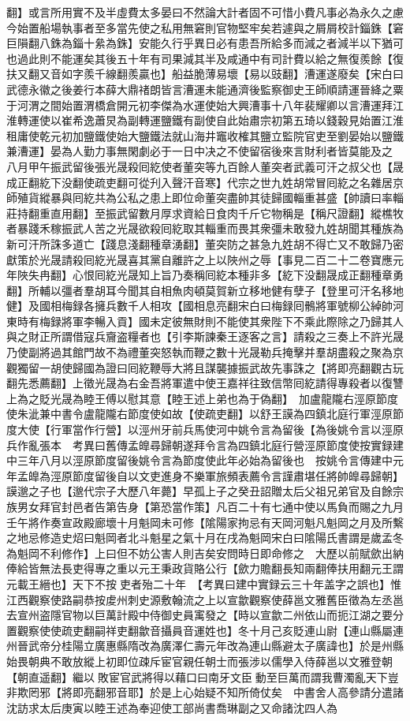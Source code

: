 翻】或言所用實不及半虛費太多晏曰不然論大計者固不可惜小費凡事必為永久之慮今始置船場執事者至多當先使之私用無窘則官物堅牢矣若遽與之屑屑校計錙銖【窘巨隕翻八銖為錙十絫為銖】安能久行乎異日必有患吾所給多而減之者減半以下猶可也過此則不能運矣其後五十年有司果減其半及咸通中有司計費以給之無復羨餘【復扶又翻又音如字羨千線翻羨贏也】船益脆薄易壞【易以豉翻】漕運遂廢矣【宋白曰武德永徽之後姜行本薛大鼎禇朗皆言漕運未能通濟後監察御史王師順請運晉絳之粟于河渭之間始置渭橋倉開元初李傑為水運使始大興漕事十八年裴耀卿以言漕運拜江淮轉運使以崔希逸蕭炅為副轉運鹽鐵有副使自此始肅宗初第五琦以錢穀見始置江淮租庸使乾元初加鹽鐵使始大鹽鐵法就山海井竈收榷其鹽立監院官吏至劉晏始以鹽鐵兼漕運】晏為人勤力事無閑劇必于一日中决之不使留宿後來言財利者皆莫能及之　八月甲午振武留後張光晟殺囘紇使者董突等九百餘人董突者武義可汗之叔父也【晟成正翻紇下没翻使疏吏翻可從刋入聲汗音寒】代宗之世九姓胡常冒囘紇之名雜居京師殖貨縱暴與囘紇共為公私之患上即位命董突盡帥其徒歸國輜重甚盛【帥讀曰率輜莊持翻重直用翻】至振武留數月厚求資給日食肉千斤它物稱是【稱尺證翻】縱樵牧者暴踐禾稼振武人苦之光晟欲殺囘紇取其輜重而畏其衆彊未敢發九姓胡聞其種族為新可汗所誅多道亡【踐息淺翻種章湧翻】董突防之甚急九姓胡不得亡又不敢歸乃密獻策於光晟請殺囘紇光晟喜其黨自離許之上以陜州之辱【事見二百二十二卷寶應元年陜失冉翻】心恨囘紇光晟知上旨乃奏稱囘紇本種非多【紇下没翻晟成正翻種章勇翻】所輔以彊者羣胡耳今聞其自相魚肉頓莫賀新立移地健有孽子【登里可汗名移地健】及國相梅録各擁兵數千人相攻【國相息亮翻宋白曰梅録囘鶻將軍號柳公綽帥河東時有梅録將軍李暢入貢】國未定彼無財則不能使其衆陛下不乘此際除之乃歸其人與之財正所謂借寇兵齎盗糧者也【引李斯諫秦王逐客之言】請殺之三奏上不許光晟乃使副將過其館門故不為禮董突怒執而鞭之數十光晟勒兵掩擊并羣胡盡殺之聚為京觀獨留一胡使歸國為證曰囘紇鞭辱大將且謀襲據振武故先事誅之【將即亮翻觀古玩翻先悉薦翻】上徵光晟為右金吾將軍遣中使王嘉祥往致信幣囘紇請得專殺者以復讐上為之貶光晟為睦王傅以慰其意【睦王述上弟也為于偽翻】　加盧龍隴右涇原節度使朱泚兼中書令盧龍隴右節度使如故【使疏吏翻】以舒王謨為四鎮北庭行軍涇原節度大使【行軍當作行營】以涇州牙前兵馬使河中姚令言為留後【為後姚令言以涇原兵作亂張本　考異曰舊傳孟皥尋歸朝遂拜令言為四鎮北庭行營涇原節度使按實録建中三年八月以涇原節度留後姚令言為節度使此年必始為留後也　按姚令言傳建中元年孟皥為涇原節度留後自以文吏進身不樂軍旅頻表薦令言謹肅堪任將帥皥尋歸朝】謨邈之子也【邈代宗子大歷八年薨】早孤上子之癸丑詔贈太后父祖兄弟官及自餘宗族男女拜官封邑者告第告身【第恐當作策】凡百二十有七通中使以馬負而賜之九月壬午將作奏宣政殿廊壞十月魁岡未可修【隂陽家拘忌有天岡河魁凡魁岡之月及所繫之地忌修造史炤曰魁岡者北斗魁星之氣十月在戌為魁岡宋白曰隂陽氏書謂是歲孟冬為魁岡不利修作】上曰但不妨公害人則吉矣安問時日即命修之　大歷以前賦歛出納俸給皆無法長吏得專之重以元王秉政貨賂公行【歛力贍翻長知兩翻俸扶用翻元王謂元載王縉也】天下不按吏者殆二十年　【考異曰建中實録云三十年盖字之誤也】惟江西觀察使路嗣恭按䖍州刺史源敷翰流之上以宣歙觀察使薛邕文雅舊臣徵為左丞邕去宣州盗隱官物以巨萬計殿中侍御史員㝢發之【時以宣歙二州依山而扼江湖之要分置觀察使使疏吏翻嗣祥吏翻歙音攝員音運姓也】冬十月己亥貶連山尉【連山縣屬連州晉武帝分桂陽立廣惠縣隋改為廣澤仁壽元年改為連山縣避太子廣諱也】於是州縣始畏朝典不敢放縱上初即位疎斥宦官親任朝士而張涉以儒學入侍薛邕以文雅登朝【朝直遥翻】繼以敗宦官武將得以藉口曰南牙文臣動至巨萬而謂我曹濁亂天下豈非欺罔邪【將即亮翻邪音耶】於是上心始疑不知所倚仗矣　中書舍人高參請分遣諸沈訪求太后庚寅以睦王述為奉迎使工部尚書喬琳副之又命諸沈四人為